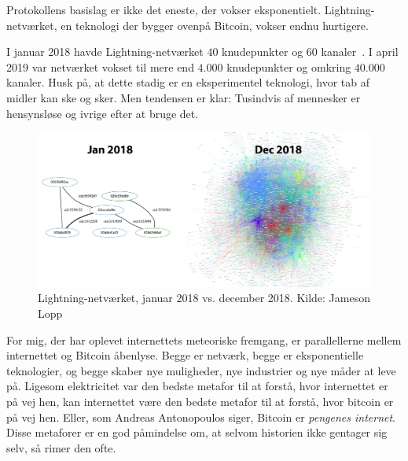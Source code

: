 \documentclass[paper=6in:9in,pagesize=pdftex,
               headinclude=on,footinclude=on,12pt]{scrbook}
\begin{document}
Protokollens basislag er ikke det eneste, der vokser eksponentielt. Lightning-netværket, en teknologi der bygger ovenpå Bitcoin, vokser endnu hurtigere.

I januar 2018 havde Lightning-netværket $40$ knudepunkter og $60$ kanaler~\cite{web:lightning-nodes}. I april 2019 var netværket vokset til mere end $4.000$ knudepunkter og omkring $40.000$ kanaler. Husk på, at dette stadig er en eksperimentel teknologi, hvor tab af midler kan ske og sker. Men tendensen er klar: Tusindvis af mennesker er hensynsløse og ivrige efter at bruge det.\begin{figure}
  \includegraphics{assets/images/lnd-growth-lopp-white.png}
  \caption{Lightning-netværket, januar 2018 vs. december 2018. Kilde: Jameson Lopp}
  \label{fig:lnd-growth-lopp-white.png}
\end{figure}

For mig, der har oplevet internettets meteoriske fremgang, er parallellerne mellem internettet og Bitcoin åbenlyse. Begge er netværk, begge er eksponentielle teknologier, og begge skaber nye muligheder, nye industrier og nye måder at leve på. Ligesom elektricitet var den bedste metafor til at forstå, hvor internettet er på vej hen, kan internettet være den bedste metafor til at forstå, hvor bitcoin er på vej hen. Eller, som Andreas Antonopoulos siger, Bitcoin er \textit{pengenes internet}. Disse metaforer er en god påmindelse om, at selvom historien ikke gentager sig selv, så rimer den ofte.
\end{document}
